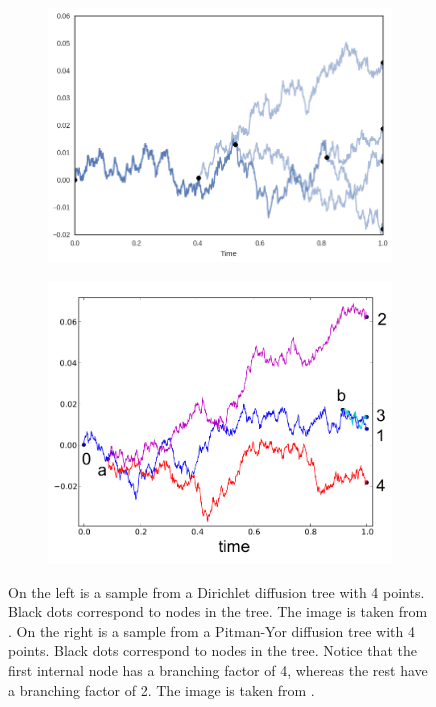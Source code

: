 \begin{figure}[H]
    \centering
    \begin{subfigure}[b]{0.45\textwidth}
        \centering
        \includegraphics[width=\textwidth]{img/trees/ddt}
    \end{subfigure}
    \hfill
    \begin{subfigure}[b]{0.45\textwidth}
        \centering
        \includegraphics[width=\textwidth]{img/trees/pydt}
    \end{subfigure}
    \caption{
      On the left is a sample from a Dirichlet diffusion tree with 4 points.
      Black dots correspond to nodes in the tree. The image is taken from \citet{Vikram2016}.
      On the right is a sample from a Pitman-Yor diffusion tree with 4 points.
      Black dots correspond to nodes in the tree. Notice
      that the first internal node has a branching factor of 4,
      whereas the rest have a branching factor of 2.
      The image is taken from \citet{Knowles2015}.
    }
    \label{fig:ddt-vis}
\end{figure}

